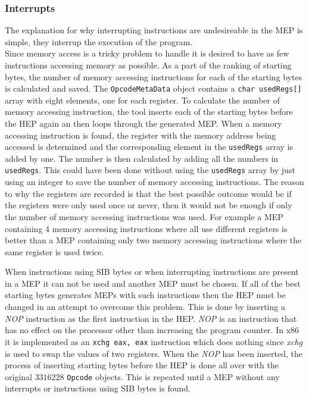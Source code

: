 \documentclass[11pt,twoside]{eitExjobb}
\begin{document}
\subsubsection{Interrupts}
The explanation for why interrupting instructions are undesireable in the MEP is simple, they interrup the execution of the program. \\

\noindent Since memory access is a tricky problem to handle it is desired to have as few instructions accessing memory as possible. As a part of the ranking of starting bytes, the number of memory accessing instructions for each of the starting bytes is calculated and saved. The \texttt{OpcodeMetaData} object contains a \texttt{char usedRegs[]} array with eight elements, one for each register. To calculate the number of memory accessing instruction, the tool inserts each of the starting bytes before the HEP again an then loops through the generated MEP. When a memory accessing instruction is found, the register with the memory address being accessed is determined and the corresponding element in the \texttt{usedRegs} array is added by one. The number is then calculated by adding all the numbers in \texttt{usedRegs}. This could have been done without using the \texttt{usedRegs} array by just using an integer to save the number of memory accessing instructions. The reason to why the registers are recorded is that the best possible outcome would be if the registers were only used once or never, then it would not be enough if only the number of memory accessing instructions was used. For example a MEP containing 4 memory accessing instructions where all use different registers is better than a MEP containing only two memory accessing instructions where the same register is used twice.

When instructions using SIB bytes or when interrupting instructions are present in a MEP it can not be used and another MEP must be chosen. If all of the best starting bytes generates MEPs with such instructions then the HEP must be changed in an attempt to overcome this problem. This is done by inserting a \emph{NOP} instruction as the first instruction in the HEP. \emph{NOP} is an instruction that has no effect on the processor other than increasing the program counter. In x86 it is implemented as an \texttt{xchg eax, eax} instruction which does nothing since \emph{xchg} is used to swap the values of two registers. When the \emph{NOP} has been inserted, the process of inserting starting bytes before the HEP is done all over with the original $3316228$ \texttt{Opcode} objects. This is repeated until a MEP without any interrupts or instructions using SIB bytes is found.
\end{document}
